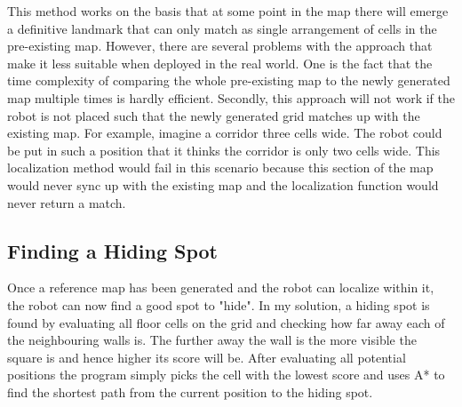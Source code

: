 \documentclass{article}
\begin{document}
This method works on the basis that at some point in the map there will emerge a definitive landmark that can only match as single arrangement of cells in the pre-existing map. However, there are several problems with the approach that make it less suitable when deployed in the real world. One is the fact that the time complexity of comparing the whole pre-existing map to the newly generated map multiple times is hardly efficient. Secondly, this approach will not work if the robot is not placed such that the newly generated grid matches up with the existing map. For example, imagine a corridor three cells wide. The robot could be put in such a position that it thinks the corridor is only two cells wide. This localization method would fail in this scenario because this section of the map would never sync up with the existing map and the localization function would never return a match.

\subsection{Finding a Hiding Spot}
Once a reference map has been generated and the robot can localize within it, the robot can now find a good spot to "hide". In my solution, a hiding spot is found by evaluating all floor cells on the grid and checking how far away each of the neighbouring walls is. The further away the wall is the more visible the square is and hence higher its score will be. After evaluating all potential positions the program simply picks the cell with the lowest score and uses A* to find the shortest path from the current position to the hiding spot.
\end{document}
